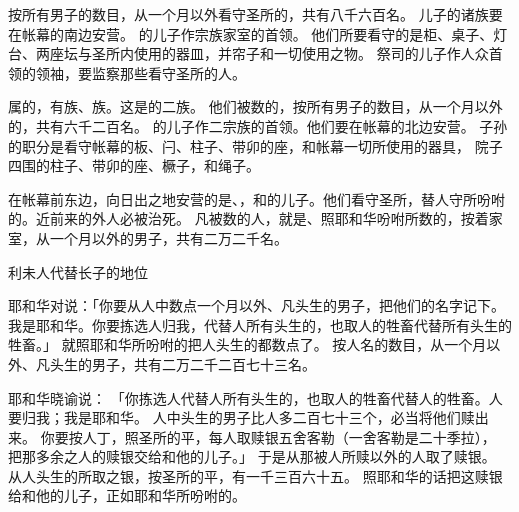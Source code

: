 {按所有男子的数目，从一个月以外看守圣所的，共有八千六百名。
儿子的诸族要在帐幕的南边安营。
的儿子{}作{}宗族家室的首领。
他们所要看守的是{}柜、桌子、灯台、两座坛与圣所内使用的器皿，并帘子和一切使用之物。
祭司{}的儿子{}作{}人众首领的领袖，要监察那些看守圣所的人。
\par }{\PP {}属{}的，有{}族、{}族。这是{}的二族。
他们被数的，按所有男子的数目，从一个月以外的，共有六千二百名。
的儿子{}作{}二宗族的首领。他们要在帐幕的北边安营。
子孙的职分是看守帐幕的板、闩、柱子、带卯的座，和帐幕一切所使用的器具，
院子四围的柱子、带卯的座、橛子，和绳子。
\par }{\PP {}在帐幕前东边，向日出之地安营的是{}、{}，和{}的儿子。他们看守圣所，替{}人守{}所吩咐的。近前来的外人必被治死。
凡被数的{}人，就是{}、{}照耶和华吩咐所数的，按着家室，从一个月以外的男子，共有二万二千名。
\par }{\SH 利未人代替长子的地位
\par }{\PP {}耶和华对{}说：「你要从{}人中数点一个月以外、凡头生的男子，把他们的名字记下。
我是耶和华。你要拣选{}人归我，代替{}人所有头生的，也取{}人的牲畜代替{}所有头生的牲畜。」
就照耶和华所吩咐的把{}人头生的都数点了。
按人名的数目，从一个月以外、凡头生的男子，共有二万二千二百七十三名。
\par }{\PP {}耶和华晓谕{}说：
「你拣选{}人代替{}人所有头生的，也取{}人的牲畜代替{}人的牲畜。{}人要归我；我是耶和华。
人中头生的男子比{}人多二百七十三个，必当将他们赎出来。
你要按人丁，照圣所的平，每人取赎银五舍客勒（一舍客勒是二十季拉），
把那多余之人的赎银交给{}和他的儿子。」
于是{}从那被{}人所赎以外的人取了赎银。
从{}人头生的所取之银，按圣所的平，有一千三百六十五{}。
照耶和华的话把这赎银给{}和他的儿子，正如耶和华所吩咐的。

}

